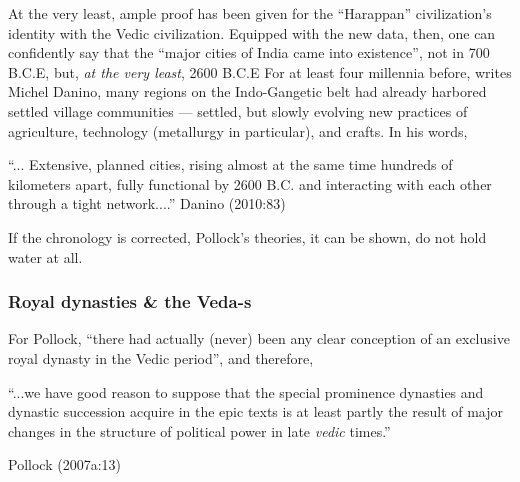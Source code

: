 At the very least, ample proof has been given for the “Harappan” civilization’s identity with the Vedic civilization. Equipped with the new data, then, one can confidently say that the “major cities of India came into existence”, not in 700 B.C.E, but, {\sl at the very least}, 2600 B.C.E For at least four millennia before, writes Michel Danino, many regions on the Indo-Gangetic belt had already harbored settled village communities --- settled, but slowly evolving new practices of agriculture, technology (metallurgy in particular), and crafts. In his words, 

\begin{myquote}
“... Extensive, planned cities, rising almost at the same time hundreds of kilometers apart, fully functional by 2600 B.C. and interacting with each other through a tight network....” Danino (2010:83)
\end{myquote}

If the chronology is corrected, Pollock’s theories, it can be shown, do not hold water at all.

\subsubsection{Royal dynasties \& the Veda-s}\label{sec1.1.2.3}

For Pollock, “there had actually (never) been any clear conception of an exclusive royal dynasty in the Vedic period”, and therefore, 

\begin{myquote}
“...we have good reason to suppose that the special prominence dynasties and dynastic succession acquire in the epic texts is at least partly the result of major changes in the structure of political power in late {\sl vedic} times.”

\hfill Pollock (2007a:13)
\end{myquote}

